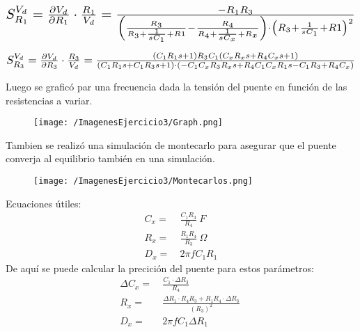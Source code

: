 \begin{align*}
\scalebox{1.5}{$
S_{R_1}^{V_d} = \frac{\partial V_d}{\partial R_1} \cdot \frac{R_1}{V_d}=
\frac{-R_1R_3}{\left( \frac{R_3}{R_3+\frac{1}{sC_1}+R1}-\frac{R_4}{R_4+\frac{1}{sC_x}+R_x} \right) \cdot  \left( R_3+\frac{1}{sC_1}+R1\right)^2}
$}
\end{align*}

\begin{align*}
\scalebox{1.5}{$
S_{R_3}^{V_d} = \frac{\partial V_d}{\partial R_3} \cdot \frac{R_3}{V_d}=\frac{(C_1R_1s+1)R_3C_1(C_xR_xs+R_4C_xs+1)}{(C_1R_1s+C_1R_3s+1)\cdot (-C_1C_xR_3R_xs+R_4C_1C_xR_1s-C_1R_3+R_4C_x)}
$}
\end{align*}


Luego se graficó par una frecuencia dada la tensión del puente en función de las resistencias a variar.
\begin{figure}[H]
	\centering
	\texttt{[image: /ImagenesEjercicio3/Graph.png]}
	\label{fig:graph}
\end{figure}
Tambien se realizó una simulación de montecarlo para asegurar que el puente converja al equilibrio también en una simulación.
\begin{figure}[H]
	\centering
	\texttt{[image: /ImagenesEjercicio3/Montecarlos.png]}
	\label{fig:graph}
\end{figure}
 Ecuaciones útiles:
\begin{equation*}
\begin{split}
	C_{x} =& \ \frac{C_1R_3}{R_4}\ F \\
	R_{x} =& \ \frac{R_1R_4}{R_3}\ \Omega \\
	D_{x} =& \ 2\pi f C_1R_1 
\end{split}
\end{equation*}
De aquí se puede calcular la precición del puente para estos parámetros:
\begin{equation*}
\begin{split}
	\Delta C_{x} =& \ \frac{C_1 \cdot \Delta R_3}{R_4}\  \\
	R_{x} =& \ \frac{\Delta R_1 \cdot R_4  R_3+R_1  R_4 \cdot \Delta R_3}{(R_3)^2}\  \\
	D_{x} =& \ 2\pi f C_1 \Delta R_1 
\end{split}
\end{equation*}

